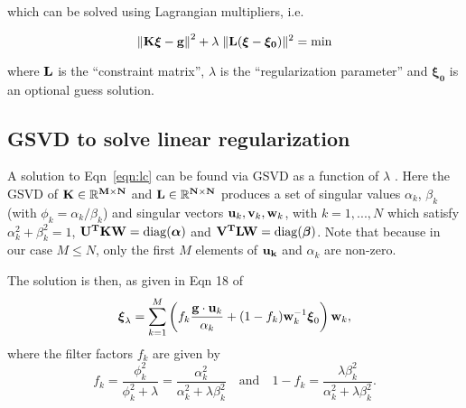 \documentclass[12pt,a4paper]{article}
\begin{document}
which can be solved using Lagrangian multipliers, i.e.

\begin{equation}\label{eqn:lc}
    \left\|\bf{K\boldsymbol{\xi}-g}\right\|^2 +\lambda\;\| {\bf L (\boldsymbol{\xi}-\boldsymbol{\xi_0})}\|^2=\mathrm{min}
\end{equation}

where ${\bf L}$ is the ``constraint matrix'', $\lambda$ is the ``regularization parameter'' and $\boldsymbol{\xi_0}$ is an optional guess solution. 

\vspace{-10pt}
\subsection*{GSVD to solve linear regularization}

A solution to Eqn~\ref{eqn:lc} can be found via GSVD as a function of $\lambda$ \citep{1992InvPr...8..849H}. Here the GSVD of $\bf{K}\in \mathbb{R}^{M\times N}$ and $\bf{L}\in \mathbb{R}^{N\times N}$ produces a set of singular values $\alpha_k$, $\beta_k$ (with $\phi_k=\alpha_k/\beta_k$) and singular vectors
${\bf u}_k, {\bf v}_k, {\bf w}_k$, with $k=1,...,N$ which satisfy $\alpha_k^2 +
\beta_k^2=1$, ${\bf U^T {K}W}=\mathrm{diag}(\boldsymbol{\alpha})$ and ${\bf V^T
LW}=\mathrm{diag}(\boldsymbol{\beta})$. Note that because in our case $M \leq N$, only the first $M$ elements of ${\bf u_k}$ and $\alpha_k$ are non-zero. 

The solution is then, as given in Eqn 18 of \citet{1992InvPr...8..849H} 
\begin{equation}\label{eqn:sol}
\boldsymbol{\xi}_\lambda =\sum_{k=1}^ M\left(f_k\frac{{\bf g}\cdot {\bf u}_k}{\alpha_k}
 +(1-f_k) {\bf w}_k^{-1}\boldsymbol{\xi}_0 \right) {\bf w}_k,
\end{equation}
where the filter factors $f_k$ are given by
\begin{equation}
f_k=\frac{\phi_k^2}{\phi_k^2 +\lambda}=\frac{\alpha_k^2}{\alpha_k^2+\lambda\beta_k^2}\quad\mathrm{and}\quad
1-f_k=\frac{\lambda\beta_k^2}{\alpha_k^2+\lambda\beta_k^2}.
\end{equation}

\end{document}
